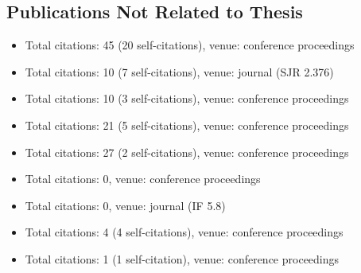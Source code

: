 \begin{refsection}
\section*{Publications Not Related to Thesis}
	\begin{itemize}
		\item{}\par{}Total citations: 45 (20 self-citations), venue: conference proceedings
		\item{}\par{}Total citations: 10 (7 self-citations), venue: journal (SJR 2.376)
		\item{}\par{}Total citations: 10 (3 self-citations), venue: conference proceedings
		\item{}\par{}Total citations: 21 (5 self-citations), venue: conference proceedings
		\item{}\par{}Total citations: 27 (2 self-citations), venue: conference proceedings
		\item{}\par{}Total citations: 0, venue: conference proceedings
		\item{}\par{}Total citations: 0, venue: journal (IF 5.8)
		\item{}\par{}Total citations: 4 (4 self-citations), venue: conference proceedings
		\item{}\par{}Total citations: 1 (1 self-citation), venue: conference proceedings
	\end{itemize}
\end{refsection}

